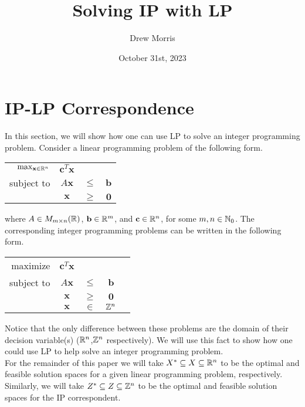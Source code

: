 \documentclass[conference]{IEEEtran}
\title{Solving IP with LP}
\author{Drew Morris}
\date{October 31st, 2023}
\numberwithin{equation}{section}
\numberwithin{figure}{section}
\theoremstyle{plain}
\theoremstyle{definition}
\newcommand{\R}{\ensuremath \mathbb{R}}
\newcommand{\Z}{\ensuremath \mathbb{Z}}
\newcommand{\N}{\ensuremath \mathbb{N}}
\newcommand{\1}{\ensuremath \mathbbm{1}}
\begin{document}
\maketitle

\section{IP-LP Correspondence}
In this section, we will show how one can use LP to solve an integer programming 
problem. Consider a linear programming problem of the following form. \\
\begin{center}\begin{tabular}{rccc}
  $\max_{\mathbf{x} \in \R^n}$ & $\mathbf{c}^T\mathbf{x}$ &        &              \\
  subject to                   & $A\mathbf{x}$            & $\leq$ & $\mathbf{b}$ \\
                               & $\mathbf{x}$             & $\geq$ & $\mathbf{0}$ \\
\end{tabular}\end{center}
where $A \in M_{m \times n}(\R)$, $\mathbf{b} \in \R^m$, and $\mathbf{c} \in \R^n$, 
for some $m,n \in \N_0$. The corresponding integer programming problems can be 
written in the following form. \\
\begin{center}\begin{tabular}{rcccc}
  maximize   & $\mathbf{c}^T\mathbf{x}$ &        &              \\
  subject to & $A\mathbf{x}$            & $\leq$ & $\mathbf{b}$ \\
             & $\mathbf{x}$             & $\geq$ & $\mathbf{0}$ \\
             & $\mathbf{x}$             & $\in$  & $\Z^n$       \\
\end{tabular}\end{center}
Notice that the only difference between these problems are the domain of their 
decision variable(s) ($\R^n$,$\Z^n$ respectively). We will use this fact to show 
how one could use LP to help solve an integer programming problem. \\ \hfill \break
For the remainder of this paper we will take $X^* \subseteq X \subseteq 
\R^n$ to be the optimal and feasible solution spaces for a given linear 
programming problem, respectively. Similarly, we will take $Z^* \subseteq Z 
\subseteq \Z^n$ to be the optimal and feasible solution spaces for the IP 
correspondent. \\
\end{document}
